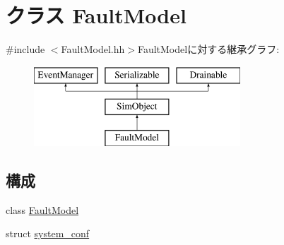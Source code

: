 \hypertarget{classFaultModel}{
\section{クラス FaultModel}
\label{classFaultModel}
}


{\ttfamily \#include $<$FaultModel.hh$>$}FaultModelに対する継承グラフ:\begin{figure}[H]
\begin{center}
\leavevmode
\includegraphics[height=3cm]{classFaultModel}
\end{center}
\end{figure}
\subsection*{構成}
\begin{DoxyCompactItemize}
\item 
class \hyperlink{classFaultModel_1_1FaultModel}{FaultModel}
\item 
struct \hyperlink{structFaultModel_1_1system__conf}{system\_\-conf}
\end{DoxyCompactItemize}
